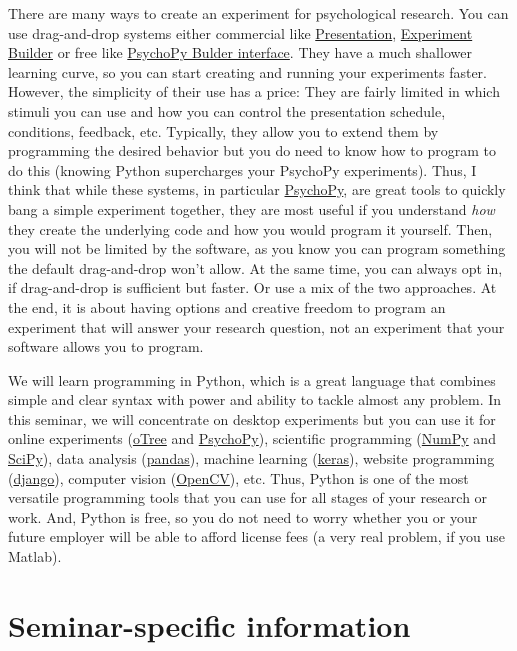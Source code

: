 \documentclass[
]{book}
\begin{document}
There are many ways to create an experiment for psychological research. You can use drag-and-drop systems either commercial like \href{https://www.neurobs.com/}{Presentation}, \href{https://www.sr-research.com/experiment-builder/}{Experiment Builder} or free like \href{https://psychopy.org/builder}{PsychoPy Bulder interface}. They have a much shallower learning curve, so you can start creating and running your experiments faster. However, the simplicity of their use has a price: They are fairly limited in which stimuli you can use and how you can control the presentation schedule, conditions, feedback, etc. Typically, they allow you to extend them by programming the desired behavior but you do need to know how to program to do this (knowing Python supercharges your PsychoPy experiments). Thus, I think that while these systems, in particular \href{https://psychopy.org/}{PsychoPy}, are great tools to quickly bang a simple experiment together, they are most useful if you understand
\emph{how} they create the underlying code and how you would program it yourself. Then, you will not be limited by the software, as you know you can program something the default drag-and-drop won't allow. At the same time, you can always opt in, if drag-and-drop is sufficient but faster. Or use a mix of the two approaches. At the end, it is about having options and creative freedom to program an experiment that will answer your research question, not an experiment that your software allows you to program.

We will learn programming in Python, which is a great language that combines simple and clear syntax with power and ability to tackle almost any problem. In this seminar, we will concentrate on desktop experiments but you can use it for online experiments (\href{https://otree.readthedocs.io/en/latest/}{oTree} and \href{https://psychopy.org/}{PsychoPy}), scientific programming (\href{https://numpy.org/}{NumPy} and \href{https://www.scipy.org/}{SciPy}), data analysis (\href{https://pandas.pydata.org/}{pandas}), machine learning (\href{https://keras.io/}{keras}), website programming (\href{https://www.djangoproject.com/}{django}), computer vision (\href{https://opencv.org/}{OpenCV}), etc. Thus, Python is one of the most versatile programming tools that you can use for all stages of your research or work. And, Python is free, so you do not need to worry whether you or your future employer will be able to afford license fees (a very real problem, if you use Matlab).

\hypertarget{seminar-specific-information}{%
\section{Seminar-specific information}\label{seminar-specific-information}}
\end{document}
